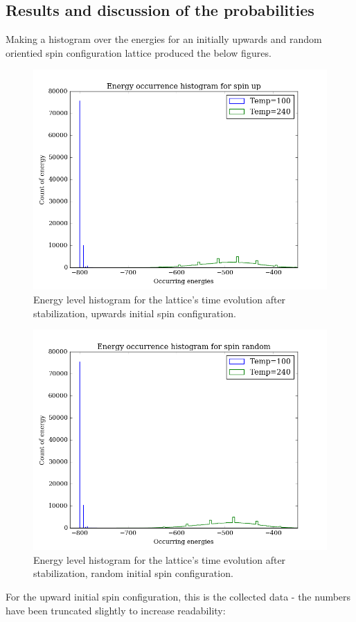 \documentclass[11pt,a4paper,notitlepage,twocolumn]{article}
\begin{document}
\subsection{Results and discussion of the probabilities}
Making a histogram over the energies for an initially upwards and random orientied spin configuration lattice produced the below figures.
\begin{figure}
[H]\center
\includegraphics[scale=0.35]{../figs/4d/probabilityhistogram_up.png}
\caption{Energy level histogram for the lattice's time evolution after stabilization, upwards initial spin configuration.}
\end{figure}
\begin{figure}
[H]\center
\includegraphics[scale=0.35]{../figs/4d/probabilityhistogram_random.png}
\caption{Energy level histogram for the lattice's time evolution after stabilization, random initial spin configuration.}
\end{figure}
For the upward initial spin configuration, this is the collected data - the numbers have been truncated slightly to increase readability:
\end{document}
